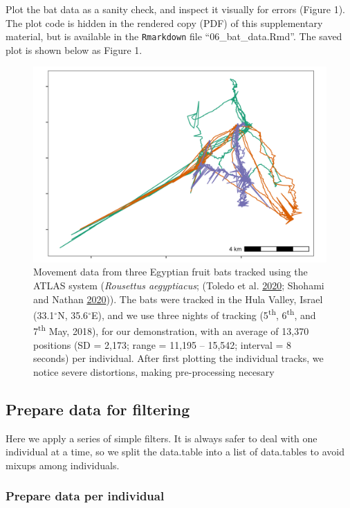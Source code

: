 \documentclass[
]{scrartcl}
\begin{document}
Plot the bat data as a sanity check, and inspect it visually for errors (Figure 1).
The plot code is hidden in the rendered copy (PDF) of this supplementary material, but is available in the \texttt{Rmarkdown} file ``06\_bat\_data.Rmd''.
The saved plot is shown below as Figure 1.

\begin{figure}
\centering
\includegraphics{figures/fig_bat_raw.png}
\caption{Movement data from three Egyptian fruit bats tracked using the ATLAS system (\emph{Rousettus aegyptiacus}; (Toledo et al. \protect\hyperlink{ref-toledo2020}{2020}; Shohami and Nathan \protect\hyperlink{ref-shohami2020}{2020})).
The bats were tracked in the Hula Valley, Israel (33.1\(^{\circ}\)N, 35.6\(^{\circ}\)E), and we use three nights of tracking (5\textsuperscript{th}, 6\textsuperscript{th}, and 7\textsuperscript{th} May, 2018), for our demonstration, with an average of 13,370 positions (SD = 2,173; range = 11,195 -- 15,542; interval = 8 seconds) per individual.
After first plotting the individual tracks, we notice severe distortions, making pre-processing necesary}
\end{figure}

\hypertarget{prepare-data-for-filtering}{%
\subsection{Prepare data for filtering}\label{prepare-data-for-filtering}}

Here we apply a series of simple filters.
It is always safer to deal with one individual at a time, so we split the data.table
into a list of data.tables to avoid mixups among individuals.

\hypertarget{prepare-data-per-individual}{%
\subsubsection{Prepare data per individual}\label{prepare-data-per-individual}}
\end{document}
